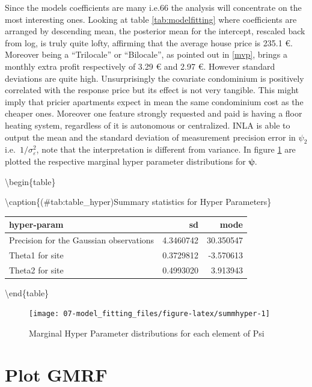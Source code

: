 \documentclass[
  12pt,
  a4paper,
  oneside]{book}
\theoremstyle{definition}
\theoremstyle{definition}
\theoremstyle{definition}
\theoremstyle{remark}
\begin{document}
Since the models coefficients are many i.e.66 the analysis will concentrate on the most interesting ones. Looking at table \ref{tab:modelfitting} where coefficients are arranged by descending mean, the posterior mean for the intercept, rescaled back from log, is truly quite lofty, affirming that the average house price is 235.1 €.
Moreover being a ``Trilocale'' or ``Bilocale'', as pointed out in \ref{mvp}, brings a monthly extra profit respectively of 3.29 € and 2.97 €. However standard deviations are quite high.
Unsurprisingly the covariate condominium is positively correlated with the response price but its effect is not very tangible. This might imply that pricier apartments expect in mean the same condominium cost as the cheaper ones.
Moreover one feature strongly requested and paid is having a floor heating system, regardless of it is autonomous or centralized.
INLA is able to output the mean and the standard deviation of measurement precision error in \(\psi_2\) i.e.~\(1 / \sigma_{\varepsilon}^{2}\), note that the interpretation is different from variance. In figure \ref{fig:summhyper} are plotted the respective marginal hyper parameter distributions for \(\boldsymbol\psi\).

\textbackslash begin\{table\}

\textbackslash caption\{(\#tab:table\_hyper)Summary statistics for Hyper Parameters\}
\centering

\begin{tabular}[t]{lrr}
\toprule
hyper-param & sd & mode\\
\midrule
Precision for the Gaussian observations & 4.3460742 & 30.350547\\
Theta1 for site & 0.3729812 & -3.570613\\
Theta2 for site & 0.4993020 & 3.913943\\
\bottomrule
\end{tabular}

\textbackslash end\{table\}

\begin{figure}

{\centering \texttt{[image: 07-model\_fitting\_files/figure-latex/summhyper-1]} 

}

\caption{Marginal Hyper Parameter distributions for each element of Psi}\label{fig:summhyper}
\end{figure}

\hypertarget{plot-gmrf}{%
\section{Plot GMRF}\label{plot-gmrf}}
\end{document}
